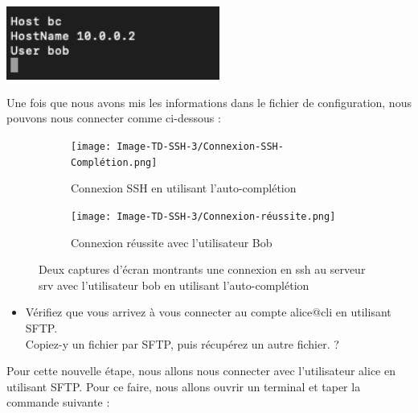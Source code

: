 \documentclass[12pt]{article}
\begin{document}
\vspace{0.3cm}

\begin{center}
  \includegraphics[width=7cm]{Image-TD-SSH-3/ligne-conf.png}
\end{center}

\vspace{0.3cm}

\newpage

Une fois que nous avons mis les informations dans le fichier de configuration, nous pouvons nous connecter comme ci-dessous : 

\vspace{0.3cm}

\begin{figure}[h]
  \centering
  \begin{subfigure}{0.30\textwidth}
    \centering
    \texttt{[image: Image-TD-SSH-3/Connexion-SSH-Complétion.png]}
    \caption{Connexion SSH en utilisant l'auto-complétion}
  \end{subfigure}
  \vspace{0.9cm} %
  \begin{subfigure}{0.45\textwidth}
    \centering
    \texttt{[image: Image-TD-SSH-3/Connexion-réussite.png]}
    \caption{Connexion réussite avec l'utilisateur Bob}
  \end{subfigure}
  \caption{Deux captures d'écran montrants une connexion en ssh au serveur srv avec l'utilisateur bob en utilisant l'auto-complétion}
\end{figure}

\vspace{0.3cm}

\begin{itemize}
  \item Vérifiez que vous arrivez à vous connecter au compte alice@cli en utilisant SFTP. \\ 
  Copiez-y un fichier par SFTP, puis récupérez un autre fichier. ?
\end{itemize}

\vspace{0.3cm}

Pour cette nouvelle étape, nous allons nous connecter avec l'utilisateur alice en utilisant SFTP. Pour ce faire, nous allons ouvrir un terminal et taper la commande suivante : 
\end{document}
